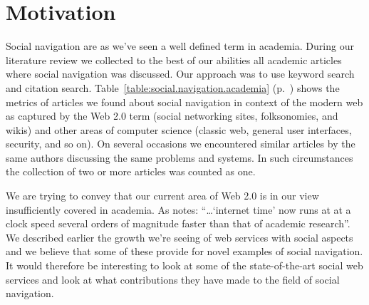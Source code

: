 \section{Motivation}

Social navigation are as we've seen a well defined term in academia. During
our literature review we collected to the best of our abilities all academic
articles where social navigation was discussed. Our approach was to use
keyword search and citation search.%
\sidefill%
Table~\ref{table:social.navigation.academia}
(p.~\pageref{table:social.navigation.academia}) shows the metrics of articles
we found about social navigation in context of the modern web as captured by
the Web 2.0 term (social networking sites, folksonomies, and wikis) and other
areas of computer science (classic web, general user interfaces, security, and
so on).
On several occasions we encountered similar articles by the same authors
discussing the same problems and systems. In such circumstances the collection
of two or more articles was counted as one.

We are trying to convey that our current area of Web 2.0 is in our view
insufficiently covered in academia.
As \citet{beer07} notes: ``\ldots `internet time' now runs at at a clock speed
several orders of magnitude faster than that of academic research''.
We described earlier the growth we're seeing of web services with social
aspects and we believe that some of these provide for novel examples of social
navigation. It would therefore be interesting to look at some of the
state-of-the-art social web services and look at what contributions they have
made to the field of social navigation.


